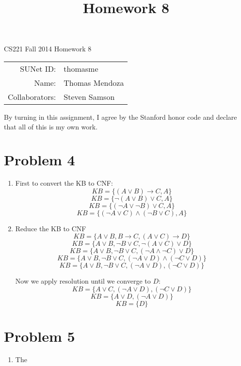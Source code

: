 \documentclass[12pt]{article}
\title{Homework 8}
\begin{document}
\begin{center}
{\Large CS221 Fall 2014 Homework 8}

\begin{tabular}{rl}
SUNet ID: & thomasme \\
Name: & Thomas Mendoza \\
Collaborators: & Steven Samson
\end{tabular}
\end{center}

By turning in this assignment, I agree by the Stanford honor code and declare
that all of this is my own work.

\section*{Problem 4}

\begin{enumerate}[label=(\alph*)]
	\item First to convert the KB to CNF:
		\[
			KB = \{(A \lor B) \to C, A\}
		\]
		\[
			KB = \{\lnot(A \lor B) \lor C, A\}
		\]
		\[
			KB = \{(\lnot A \lor \lnot B) \lor C, A\}
		\]
		\[
			KB = \{(\lnot A \lor C) \land (\lnot B \lor C), A\}
		\]

	\item Reduce the KB to CNF
		\[
			KB = \{A \lor B, B \to C, (A \lor C) \to D\}
		\]
		\[
			KB = \{A \lor B, \lnot B \lor C, \lnot (A \lor C) \lor D\}
		\]
		\[
			KB = \{A \lor B, \lnot B \lor C, (\lnot A \land \lnot C) \lor D\}
		\]
		\[
			KB = \{A \lor B, \lnot B \lor C, (\lnot A \lor D) \land (\lnot C \lor D)\}
		\]
		\[
			KB = \{A \lor B, \lnot B \lor C, (\lnot A \lor D), (\lnot C \lor D)\}
		\]

		Now we apply resolution until we converge to \(D\):
		\[
			KB = \{A \lor C, (\lnot A \lor D), (\lnot C \lor D)\}
		\]
		\[
			KB = \{A \lor D, (\lnot A \lor D)\}
		\]
		\[
			KB = \{D\}
		\]


\end{enumerate}

\section*{Problem 5}

\begin{enumerate}[label=(\alph*)]
	\item The

\end{enumerate}
\end{document}
